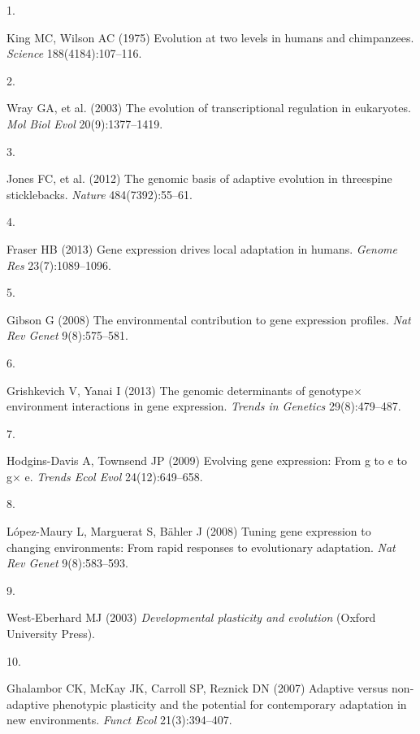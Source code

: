 \documentclass[9pt,twocolumn,twoside,lineno]{pnas-new}
\newlength{\cslhangindent}
\newlength{\csllabelwidth}
\newlength{\cslentryspacingunit} %
\newenvironment{CSLReferences}[2] %
 {%
  \setlength{\parindent}{0pt}
  \ifodd #1
  \let\oldpar\par
  \def\par{\hangindent=\cslhangindent\oldpar}
  \fi
  \setlength{\parskip}{#2\cslentryspacingunit}
 }%
 {}
\newcommand{\CSLLeftMargin}[1]{\parbox[t]{\csllabelwidth}{#1}}
\newcommand{\CSLRightInline}[1]{\parbox[t]{\linewidth - \csllabelwidth}{#1}\break}
\begin{document}
\hypertarget{refs}{}
\begin{CSLReferences}{0}{0}
\leavevmode{}%
\CSLLeftMargin{1. }%
\CSLRightInline{King MC, Wilson AC (1975) Evolution at two levels in
humans and chimpanzees. \emph{Science} 188(4184):107--116.}

\leavevmode{}%
\CSLLeftMargin{2. }%
\CSLRightInline{Wray GA, et al. (2003) The evolution of transcriptional
regulation in eukaryotes. \emph{Mol Biol Evol} 20(9):1377--1419.}

\leavevmode{}%
\CSLLeftMargin{3. }%
\CSLRightInline{Jones FC, et al. (2012) The genomic basis of adaptive
evolution in threespine sticklebacks. \emph{Nature} 484(7392):55--61.}

\leavevmode{}%
\CSLLeftMargin{4. }%
\CSLRightInline{Fraser HB (2013) Gene expression drives local adaptation
in humans. \emph{Genome Res} 23(7):1089--1096.}

\leavevmode{}%
\CSLLeftMargin{5. }%
\CSLRightInline{Gibson G (2008) The environmental contribution to gene
expression profiles. \emph{Nat Rev Genet} 9(8):575--581.}

\leavevmode{}%
\CSLLeftMargin{6. }%
\CSLRightInline{Grishkevich V, Yanai I (2013) The genomic determinants
of genotype\(\times\) environment interactions in gene expression.
\emph{Trends in Genetics} 29(8):479--487.}

\leavevmode{}%
\CSLLeftMargin{7. }%
\CSLRightInline{Hodgins-Davis A, Townsend JP (2009) Evolving gene
expression: From g to e to g\(\times\) e. \emph{Trends Ecol Evol}
24(12):649--658.}

\leavevmode{}%
\CSLLeftMargin{8. }%
\CSLRightInline{López-Maury L, Marguerat S, Bähler J (2008) Tuning gene
expression to changing environments: From rapid responses to
evolutionary adaptation. \emph{Nat Rev Genet} 9(8):583--593.}

\leavevmode{}%
\CSLLeftMargin{9. }%
\CSLRightInline{West-Eberhard MJ (2003) \emph{Developmental plasticity
and evolution} (Oxford University Press).}

\leavevmode{}%
\CSLLeftMargin{10. }%
\CSLRightInline{Ghalambor CK, McKay JK, Carroll SP, Reznick DN (2007)
Adaptive versus non-adaptive phenotypic plasticity and the potential for
contemporary adaptation in new environments. \emph{Funct Ecol}
21(3):394--407.}


\end{CSLReferences}
\end{document}
